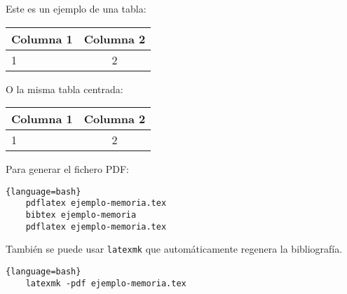   Este es un ejemplo de una tabla:
  
  \begin{tabular}{|l|c|}
    \hline
    Columna 1 & Columna 2 \\ \hline
    1 & 2 \\ \hline
  \end{tabular}


  \vspace*{1cm}
  O la misma tabla centrada:

  \begin{center}
    \begin{tabular}{|l|c|}
      \hline
      Columna 1 & Columna 2 \\ \hline
      1 & 2 \\ \hline
    \end{tabular}
  \end{center}

  Para generar el fichero PDF:
  
  \begin{lstlisting}{language=bash}
    pdflatex ejemplo-memoria.tex
    bibtex ejemplo-memoria
    pdflatex ejemplo-memoria.tex
\end{lstlisting}

  También se puede usar \texttt{latexmk} que automáticamente regenera la bibliografía.
  \begin{lstlisting}{language=bash}
    latexmk -pdf ejemplo-memoria.tex
\end{lstlisting}

  
